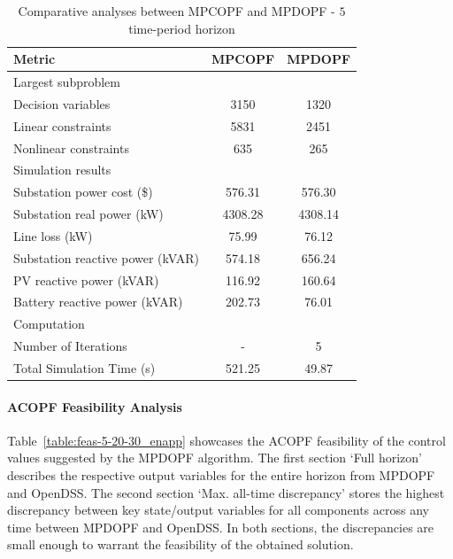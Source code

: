 \begin{table}[t]
    \centering
    \caption{Comparative analyses between MPCOPF and MPDOPF - $5$ time-period horizon}
    \begin{tabular}{|l|c|c|}
    \hline
    \textbf{Metric} & \textbf{MPCOPF} & \textbf{MPDOPF} \\ \hline
    Largest subproblem & \multicolumn{2}{c|}{} \\ \hline
    \quad Decision variables & {3150} & {1320} \\ \hline
    \quad Linear constraints & {5831} & {2451} \\ \hline
    \quad Nonlinear constraints & {635} & {265} \\ \hline
    Simulation results  & \multicolumn{2}{c|}{} \\ \hline
    \quad Substation power cost (\$) & 576.31 & 576.30 \\ \hline
    \quad Substation real power (kW) & 4308.28 & 4308.14 \\ \hline
    \quad Line loss (kW) & 75.99 & 76.12 \\ \hline
    \quad Substation reactive power (kVAR) & 574.18 & 656.24 \\ \hline
    \quad PV reactive power (kVAR) & 116.92 & 160.64 \\ \hline
    \quad Battery reactive power (kVAR) & 202.73 & 76.01 \\ \hline
    Computation  & \multicolumn{2}{c|}{} \\ \hline
    \quad Number of Iterations & - & 5 \\ \hline
    \quad Total Simulation Time (s) & 521.25 & 49.87 \\ \hline
    \end{tabular}
    \label{table:opt-5-20-30_enapp}
    \vspace{-3mm}
\end{table}

\paragraph{ACOPF Feasibility Analysis}
Table~\ref{table:feas-5-20-30_enapp} showcases the ACOPF feasibility of the control values suggested by the MPDOPF algorithm. The first section `Full horizon' describes the respective output variables for the entire horizon from MPDOPF and OpenDSS. The second section `Max. all-time discrepancy' stores the highest discrepancy between key state/output variables for all components across any time between MPDOPF and OpenDSS. In both sections, the discrepancies are small enough to warrant the feasibility of the obtained solution. 

